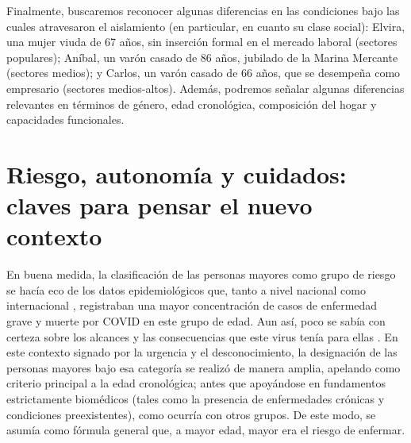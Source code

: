 \begin{refsection}
Finalmente, buscaremos reconocer algunas diferencias en las condiciones bajo las cuales atravesaron el aislamiento (en particular, en cuanto su clase social): Elvira, una mujer viuda de 67 años, sin inserción formal en el mercado laboral (sectores populares); Aníbal, un varón casado de 86 años, jubilado de la Marina Mercante (sectores medios); y Carlos, un varón casado de 66 años, que se desempeña como empresario (sectores medios-altos). Además, podremos señalar algunas diferencias relevantes en términos de género, edad cronológica, composición del hogar y capacidades funcionales.


\section[Riesgo, autonomía y cuidados: claves para pensar el nuevo contexto]{Riesgo, autonomía y cuidados: claves para pensar el nuevo contexto}
\label{cap-30.riesgo-autonomia-y-cuidados-claves-para-pensar-el-nuevo-contexto}
En buena medida, la clasificación de las personas mayores como grupo de riesgo se hacía eco de los datos epidemiológicos que, tanto a nivel nacional \protect\parencite{4215-MINISTERIO2021} como internacional \protect\parencite{4216-CEPAL2020}, registraban una mayor concentración de casos de enfermedad grave y muerte por COVID en este grupo de edad. Aun así, poco se sabía con certeza sobre los alcances y las consecuencias que este virus tenía para ellas \protect\parencite{4205-HEID2021,4211-CIRINO2022}. En este contexto signado por la urgencia y el desconocimiento, la designación de las personas mayores bajo esa categoría se realizó de manera amplia, apelando como criterio principal a la edad cronológica; antes que apoyándose en fundamentos estrictamente biomédicos (tales como la presencia de enfermedades crónicas y condiciones preexistentes), como ocurría con otros grupos. De este modo, se asumía como fórmula general que, a mayor edad, mayor era el riesgo de enfermar.


\end{refsection}
